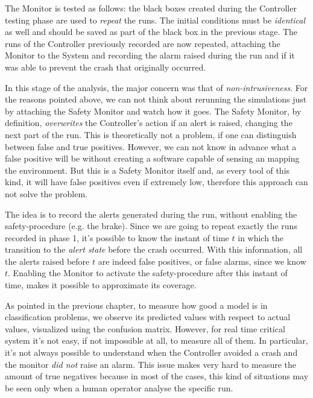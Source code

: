 The Monitor is tested as follows: the black boxes created during the Controller testing phase are used to \textsl{repeat} the runs. The initial conditions must be \textsl{identical} as well and should be saved as part of the black box in the previous stage. The runs of the Controller previously recorded are now repeated, attaching the Monitor to the System and recording the alarm raised during the run and if it was able to prevent the crash that originally occurred.

In this stage of the analysis, the major concern was that of \textsl{non-intrusiveness}. For the reasons pointed above, we can not think about rerunning the simulations just by attaching the Safety Monitor and watch how it goes. The Safety Monitor, by definition, \textsl{overwrites} the Controller's action if an alert is raised, changing the next part of the run. This is theoretically not a problem, if one can distinguish between false and true positives. However, we can not know in advance what a false positive will be without creating a software capable of sensing an mapping the environment. But this is a Safety Monitor itself and, as every tool of this kind, it will have false positives even if extremely low, therefore this approach can not solve the problem.









The idea is to record the alerts generated during the run, without enabling the safety-procedure (e.g. the brake). Since we are going to repeat exactly the runs recorded in phase 1, it's possible to know the instant of time $t$ in which the transition to the \textsl{alert state} before the crash occurred. With this information, all the alerts raised before $t$ are indeed false positives, or false alarms, since we know $t$. Enabling the Monitor to activate the safety-procedure after this instant of time, makes it possible to approximate its coverage. 

As pointed in the previous chapter, to measure how good a model is in classification problems, we observe its predicted values with respect to actual values, visualized using the confusion matrix. However, for real time critical system it's not easy, if not impossible at all, to measure all of them. In particular, it's not always possible to understand when the Controller avoided a crash and the monitor \textsl{did not} raise an alarm. This issue makes very hard to measure the amount of true negatives because in most of the cases, this kind of situations may be seen only when a human operator analyse the specific run.


